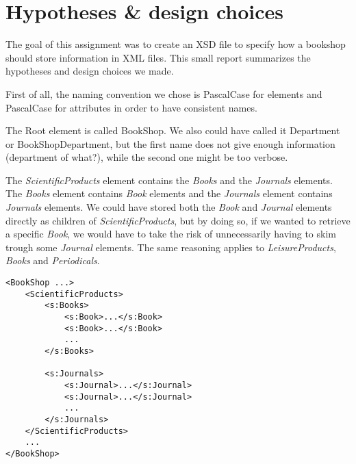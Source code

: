 \section{Hypotheses \& design choices}

The goal of this assignment was to create an XSD file to specify how a bookshop
should store information in XML files. This small report summarizes the
hypotheses and design choices we made.

First of all, the naming convention we chose is PascalCase for elements and
PascalCase for attributes in order to have consistent names.

The Root element is called BookShop. We also could have called it
Department or BookShopDepartment, but the first name does not give enough
information (department of what?), while the second one might be too verbose.

The \emph{ScientificProducts} element contains the \emph{Books} and the
\emph{Journals} elements. The \emph{Books} element contains \emph{Book} elements
and the \emph{Journals} element contains \emph{Journals} elements.
We could have stored both the \emph{Book} and \emph{Journal} elements directly
as children of \emph{ScientificProducts}, but by doing so, if we wanted to
retrieve a specific \emph{Book}, we would have to take the risk of unnecessarily
having to skim trough some \emph{Journal} elements.
The same reasoning applies to \emph{LeisureProducts}, \emph{Books} and
\emph{Periodicals}.
\begin{lstlisting}
<BookShop ...>
    <ScientificProducts>
        <s:Books>
            <s:Book>...</s:Book>
            <s:Book>...</s:Book>
            ...
        </s:Books>
        
        <s:Journals>
            <s:Journal>...</s:Journal>
            <s:Journal>...</s:Journal>
            ...
        </s:Journals>
    </ScientificProducts>
    ...
</BookShop>
\end{lstlisting}






